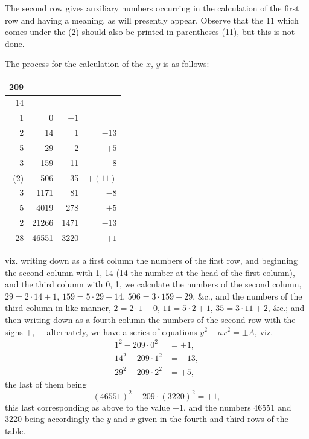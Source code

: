 \documentclass[11pt,a4paper]{book}
\begin{document}
{{{The second row gives auxiliary numbers occurring in the calculation of the first row and having a meaning, as will presently appear. Observe that the 11 which comes under the (2) should also be printed in parentheses (11), but this is not done.

The process for the calculation of the $x$, $y$ is as follows:

\begin{center}
\begin{tabular}{r|r|r|r}
209 & & & \\ \hline
14 & & & \\
1 & 0 & $+1$ & \\
2 & 14 & 1 & $-13$ \\
5 & 29 & 2 & $+5$ \\
3 & 159 & 11 & $-8$ \\
(2) & 506 & 35 & $+(11)$ \\
3 & 1171 & 81 & $-8$ \\
5 & 4019 & 278 & $+5$ \\
2 & 21266 & 1471 & $-13$ \\
28 & 46551 & 3220 & $+1$
\end{tabular}
\end{center}

viz. writing down as a first column the numbers of the first row, and beginning the second column with 1, 14 (14 the number at the head of the first column), and the third column with 0, 1, we calculate the numbers of the second column, $29 = 2 \cdot 14 + 1$, $159 = 5 \cdot 29 + 14$, $506 = 3 \cdot 159 + 29$, \&c., and the numbers of the third column in like manner, $2 = 2 \cdot 1 + 0$, $11 = 5 \cdot 2 + 1$, $35 = 3 \cdot 11 + 2$, \&c.; and then writing down as a fourth column the numbers of the second row with the signs $+$, $-$ alternately, we have a series of equations $y^{2} - ax^{2} = \pm A$, viz.
\[
\begin{aligned}
1^{2} - 209 \cdot 0^{2} &= +1, \\
14^{2} - 209 \cdot 1^{2} &= -13, \\
29^{2} - 209 \cdot 2^{2} &= +5,
\end{aligned}
\]
the last of them being
\[ (46551)^{2} - 209 \cdot (3220)^{2} = +1, \]
this last corresponding as above to the value $+1$, and the numbers 46551 and 3220 being accordingly the $y$ and $x$ given in the fourth and third rows of the table.


}}}
\end{document}

